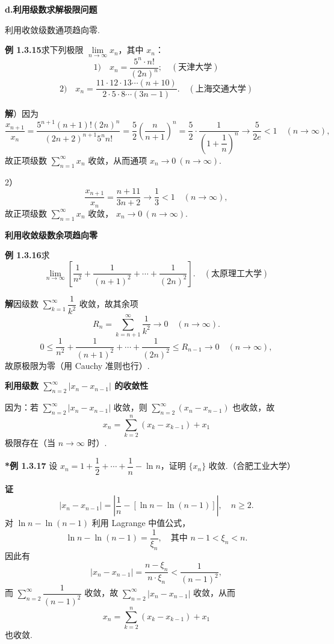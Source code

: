 \documentclass[UTF8, 12pt, fontset=fandol, oneside]{ctexart}
\begin{document}
\noindent\textbf{d.\quad 利用级数求解极限问题}

利用收敛级数通项趋向零.

\noindent\textbf{例 1.3.15}\quad 求下列极限 $\lim\limits_{n\to\infty}x_n$，其中 $x_n$：
\[
1)\quad x_n=\frac{5^n\cdot n!}{(2n)^n};\quad(\text{天津大学})
\]
\[
2)\quad
x_n=\frac{11\cdot12\cdot13\cdots(n+10)}
{2\cdot5\cdot8\cdots(3n-1)}.
\quad(\text{上海交通大学})
\]

\noindent\textbf{解}）因为
\[
  \frac{x_{n+1}}{x_n}
  =\frac{5^{n+1}(n+1)!(2n)^n}{(2n+2)^{n+1}5^nn!}
  =\frac52\left(\frac n{n+1}\right)^n
  =\frac52\cdot\frac1{\left(1+\dfrac1n\right)^n}
  \to\frac5{2e}<1\quad(n\to\infty),
\]
故正项级数 $\sum\limits_{n=1}^\infty x_n$ 收敛，从而通项
$x_n\to0\ (n\to\infty)$.

2）
\[
  \frac{x_{n+1}}{x_n}
  =\frac{n+11}{3n+2}\to\frac13<1\quad(n\to\infty),
\]
故正项级数 $\sum\limits_{n=1}^\infty x_n$ 收敛，
$x_n\to0\ (n\to\infty)$.

\noindent\textbf{利用收敛级数余项趋向零}

\noindent\textbf{例 1.3.16}\quad 求
\[
  \lim_{n\to\infty}
  \left[\frac1{n^2}+\frac1{(n+1)^2}+\cdots+\frac1{(2n)^2}\right].
\quad(\text{太原理工大学})
\]

\noindent\textbf{解}\quad 因级数 $\sum\limits_{k=1}^\infty\dfrac1{k^2}$ 收敛，故其余项
\[
  R_n=\sum_{k=n+1}^\infty\frac1{k^2}\to0\quad(n\to\infty).
\]
\[
  0\le
  \frac1{n^2}+\frac1{(n+1)^2}+\cdots+\frac1{(2n)^2}
  \le R_{n-1}\to0\quad(n\to\infty),
\]
故原极限为零（用 Cauchy 准则也行）.

\noindent\textbf{利用级数 $\sum\limits_{n=2}^\infty|x_n-x_{n-1}|$ 的收敛性}

因为：若 $\sum\limits_{n=2}^\infty|x_n-x_{n-1}|$ 收敛，则
$\sum\limits_{n=2}^\infty(x_n-x_{n-1})$ 也收敛，故
\[
  x_n=\sum_{k=2}^n(x_k-x_{k-1})+x_1
\]
极限存在（当 $n\to\infty$ 时）.

\noindent\textbf{*例 1.3.17}\quad
设 $x_n=1+\dfrac12+\cdots+\dfrac1n-\ln n$，证明 $\{x_n\}$ 收敛.（合肥工业大学）

\noindent\textbf{证}\quad
\[
  |x_n-x_{n-1}|
  =\left|\frac1n-[\ln n-\ln(n-1)]\right|,
  \quad n\ge2.
\]
对 $\ln n-\ln(n-1)$ 利用 Lagrange 中值公式，
\[
  \ln n-\ln(n-1)=\frac1{\xi_n},
  \quad\text{其中 }n-1<\xi_n<n.
\]
因此有
\[
  |x_n-x_{n-1}|
  =\frac{n-\xi_n}{n\cdot\xi_n}
  <\frac1{(n-1)^2},
\]
而 $\sum\limits_{n=2}^\infty\dfrac1{(n-1)^2}$ 收敛，故
$\sum\limits_{n=2}^\infty|x_n-x_{n-1}|$ 收敛，从而
\[
  x_n=\sum_{k=2}^n(x_k-x_{k-1})+x_1
\]
也收敛.
\end{document}
